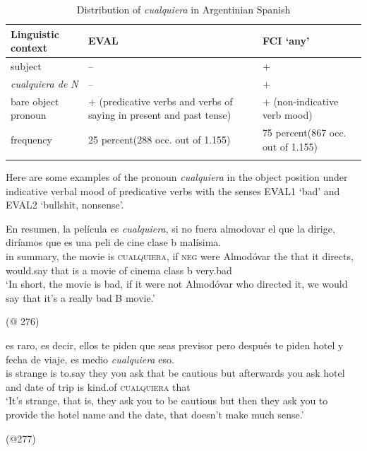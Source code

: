 \begin{table}
\begin{tabularx}{\textwidth}{QQQ}
\lsptoprule
 Linguistic context & EVAL & FCI ‘any' \\
 \midrule
 subject & -- & + \\
 \tablevspace
  \textit{cualquiera de N} & -- & + \\
 \tablevspace
 bare object pronoun & + (predicative verbs and verbs of saying in present and past tense) & + (non-indicative verb mood) \\
 \tablevspace
 frequency & 25 percent\newline (288 occ. out of 1.155) & 75 percent\newline (867 occ. out of 1.155) \\
 \lspbottomrule
\end{tabularx}
\caption{\label{tab:distribution-ArgSp.}Distribution of \textit{cualquiera} in Argentinian Spanish} %
\end{table}

{Here are some examples of the pronoun \textit{cualquiera} in the object position under indicative verbal mood of predicative verbs with the senses EVAL1 ‘bad’ and EVAL2 ‘bullshit, nonsense’.}

\ea \label{ex:key:4-1}
    \gll En resumen, la película es \textit{cualquiera}, si no fuera almodovar el que la dirige, diríamos que es una peli de cine clase b malísima.\\
    in summary, the movie is \textsc{cualquiera}, if \textsc{neg} were Almodóvar the that it directs, would.say that is a movie of cinema class b very.bad\\
    \glt ‘In short, the movie is bad, if it were not Almodóvar who directed it, we would say that it's a really bad B movie.' 
    
    (@ 276)
\z

\ea \label{ex:key:4-2}
    \gll es raro, es decir, ellos te piden que seas previsor pero después te piden hotel y fecha de viaje, es medio \textit{cualquiera} eso.\\
    is strange is to.say they you ask that be cautious but afterwards you ask hotel and date of trip is kind.of \textsc{cualquiera} that \\
    \glt ‘It's strange, that is, they ask you to be cautious but then they ask you to provide the hotel name and the date, that doesn't make much sense.' 
    
    (@277)  
\z

